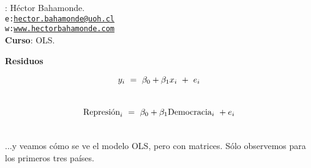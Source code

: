 \documentclass[10pt]{article}
\begin{document}


\thispagestyle{fancy} %





\hspace{-5mm}{\bf Profesor}: H\'ector Bahamonde.\\
\texttt{e:}\href{mailto:hector.bahamonde@uoh.cl}{\texttt{hector.bahamonde@uoh.cl}}\\
\texttt{w:}\href{http://www.hectorbahamonde.com}{\texttt{www.hectorbahamonde.com}}\\
{\bf Curso}: OLS.

\begin{center}
\textbf{Residuos}


\begin{gather}
y_{i} \ =\ \beta_{0}+\beta_{1}x_{i} \ +\ e_{i} \notag\\
 \notag
\end{gather}


\begin{gather}
\text{Represi\'on}_{i} \ =\ \beta_{0}+\beta_{1}\text{Democracia}_{i} \ +e_{i} \notag\\
\notag
\end{gather}

\end{center}



...y veamos c\'omo se ve el modelo OLS, pero con matrices. S\'olo observemos para los primeros tres pa\'ises.
\end{document}
